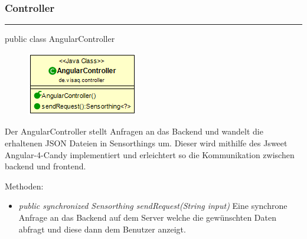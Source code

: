 \subsubsection{Controller}

\rule{\textwidth}{0.4pt}
public class AngularController

\begin{minipage}{0.4\textwidth}
    \begin{figure}[H]
        {\centering\includegraphics[scale = 0.7]{media/frontend/controller/AngularController_Class.png}}
    \end{figure}
    \end{minipage} \hfill
    \begin{minipage}{0.6\textwidth}
Der AngularController stellt Anfragen an das Backend und wandelt die erhaltenen JSON Dateien in Sensorthings um. Dieser wird mithilfe des \gls{Jsweet} \gls{Angular-4-Candy} implementiert und erleichtert so die Kommunikation zwischen backend und frontend.
\end{minipage}
Methoden: \begin{itemize}
    \item \emph{public synchronized Sensorthing sendRequest(String input)} Eine synchrone Anfrage an das Backend auf dem Server welche die gewünschten Daten abfragt und diese dann dem Benutzer anzeigt.
\end{itemize}